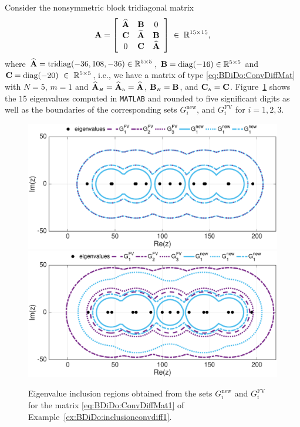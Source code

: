 \begin{example}\label{ex:BDiDo:inclusionconvdiff1}{\textrm
Consider the  nonsymmetric block tridiagonal matrix
\begin{equation}\label{eq:BDiDo:ConvDiffMat1}
\mathbf{A}=\left[
  \begin{array}{ccc}
 \widehat{\mathbf{A}}  & \mathbf{B}  &      0     \\
     \mathbf{C}  &   \widehat{\mathbf{A}} &  \mathbf{B}     \\
      0     & \mathbf{C}  &  \widehat{\mathbf{A}}  \\
  \end{array}
\right]\;\in\;{\mathbb R}^{15 \times 15},
\end{equation}
where $\widehat{\mathbf{A}}=\mathrm{tridiag}(-36,108,-36)\in\mathbb{R}^{5\times5}$, $\mathbf{B}=\mathrm{diag}(-16)\in\mathbb{R}^{5\times5}$ and
$\mathbf{C}=\mathrm{diag}(-20)~\in~\mathbb{R}^{5\times5}$, i.e., we have a matrix of type \eqref{eq:BDiDo:ConvDiffMat} with $N=5$, $m=1$ and $\widehat{\mathbf{A}}_{\scriptscriptstyle H}=\widehat{\mathbf{A}}_{\scriptscriptstyle h}=\widehat{\mathbf{A}}$, $\mathbf{B}_{\scriptscriptstyle H}=\mathbf{B}$, and  $\mathbf{C}_{\scriptscriptstyle h}=\mathbf{C}$. \textnormal{Figure~\ref{fig:BDiDo:ex:inclusion3}}
shows the $15$ eigenvalues computed in \textnormal{\texttt{MATLAB}} and rounded to five significant digits as well as the boundaries of the corresponding sets $G_i^{\text{new}}$, and $G_i^{\text{FV}}$ for $i=1,2,3$.
%
\begin{figure}[tbph]
\centering
\vspace*{-0.4cm}
\includegraphics[width=0.49\linewidth]{figures/Example416_b1}
\includegraphics[width=0.49\linewidth]{figures/Example416_b2}
\caption{Eigenvalue inclusion regions obtained from the sets
$G_i^{\text{new}}$ and $G_i^{\text{FV}}$ for the matrix \eqref{eq:BDiDo:ConvDiffMat1} of Example~\ref{ex:BDiDo:inclusionconvdiff1}.}
\label{fig:BDiDo:ex:inclusion3}
\end{figure}

}
\end{example}
